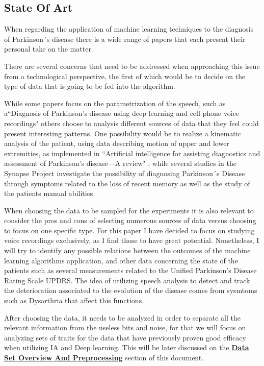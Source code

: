 \documentclass[12pt, a4paper]{article}
\begin{document}
	\clearpage
	
	\subsection{State Of Art}
	
	When regarding the application of machine learning techniques to the diagnosis of Parkinson´s disease there is a wide range of papers that each present their personal take on the matter.
	
	There are several concerns that need to be addressed when approaching this issue from a technological perspective, the first of which would be to decide on the type of data that is going to be fed into the algorithm.
	
	While some papers focus on the parametrization of the speech, such as a``Diagnosis of Parkinson's disease using deep learning and cell phone voice recordings" \cite{deeplearningygrabaciones} others choose to analysis different sources of data that they feel could present interesting patterns. One possibility would be to realize a kinematic analysis of the patient, using data describing motion of upper and lower extremities, as implemented in ``Artificial intelligence for assisting diagnostics and assessment of Parkinson’s disease—A review" \cite{belic2019artificial}, while several studies in the Synapse Project investigate the possibility of diagnosing Parkinson´s Disease through symptoms related to the loss of recent memory as well as the study of the patients manual abilities.
	
	When choosing the data to be sampled for the experiments it is also relevant to consider the pros and cons of selecting numerous sources of data versus choosing to focus on one specific type. For this paper I have decided to focus on studying voice recordings exclusively, as I find those to have great potential. Nonetheless, I will try to identify any possible relations between the outcomes of the machine learning algorithms application, and other data concerning the state of the patients such as several measurements related to the Unified Parkinson's Disease Rating Scale UPDRS. The idea of utilizing speech analysis to detect and track the deterioration associated to the evolution of the disease comes from sysmtoms such as Dysarthria that affect this functions. \cite{cnntoformantmeasures}
	
	After choosing the data, it needs to be analyzed in order to separate all the relevant information from the useless bits and noise, for that we will focus on analyzing sets of traits for the data that have previously proven good efficacy when utilizing IA and Deep learning. This will be later discussed on the \hyperref[sec:Data]{\textbf{Data Set Overview And Preprocessing}} section of this document.
	
\end{document}
